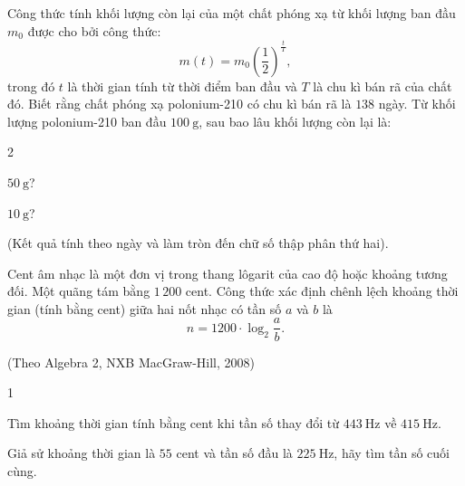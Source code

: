 \begin{bt}%

	Công thức tính khối lượng còn lại của một chất phóng xạ từ khối lượng ban đầu $m_0$ được cho bởi công thức:
	$$m(t)=m_0\left(\dfrac{1}{2}\right)^{\tfrac{t}{T}},$$
	trong đó $t$ là thời gian tính từ thời điểm ban đầu và $T$ là chu kì bán rã của chất đó. Biết rằng chất phóng xạ polonium-210 có chu kì bán rã là $ 138 $ ngày. Từ khối lượng polonium-210 ban đầu $100 \mathrm{~g}$, sau bao lâu khối lượng còn lại là:
	\begin{enumEX}{2}
		\item $50 \mathrm{~g}$?
		\item $10 \mathrm{~g}$?
	\end{enumEX}
	(Kết quả tính theo ngày và làm tròn đến chữ số thập phân thứ hai).
\end{bt}

\begin{bt}%

	Cent âm nhạc là một đơn vị trong thang lôgarit của cao độ hoặc khoảng tương đối. Một quãng tám bằng $ 1\,200 $ cent. Công thức xác định chênh lệch khoảng thời gian (tính bằng cent) giữa hai nốt nhạc có tần số $a$ và $b$ là
	$$n=1200 \cdot \log_2 \dfrac{a}{b}.$$
\begin{flushright}
	(Theo Algebra 2, NXB MacGraw-Hill, 2008)
\end{flushright}
	\begin{enumEX}{1}
		\item Tìm khoảng thời gian tính bằng cent khi tần số thay đổi từ $443 \mathrm{~Hz}$ về $415 \mathrm{~Hz}$.
		\item Giả sử khoảng thời gian là $ 55 $ cent và tần số đầu là $225 \mathrm{~Hz}$, hãy tìm tần số cuối cùng.
	\end{enumEX}
\end{bt}

